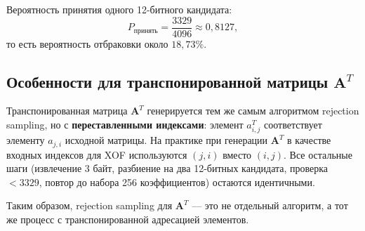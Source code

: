 \documentclass[11pt,a4paper]{article}
\begin{document}
Вероятность принятия одного 12-битного кандидата:
\[
    P_{\text{принять}} = \frac{3329}{4096} \approx 0{,}8127,
\]
то есть вероятность отбраковки около \(18{,}73\%\).

\subsection{Особенности для транспонированной матрицы \(\mathbf{A}^T\)}

Транспонированная матрица \(\mathbf{A}^T\) генерируется тем же самым алгоритмом rejection sampling, но с \textbf{переставленными индексами}: элемент \(a^T_{i,j}\) соответствует элементу \(a_{j,i}\) исходной матрицы. На практике при генерации \(\mathbf{A}^T\) в качестве входных индексов для XOF используются \((j,i)\) вместо \((i,j)\). Все остальные шаги (извлечение 3 байт, разбиение на два 12-битных кандидата, проверка \(< 3329\), повтор до набора 256 коэффициентов) остаются идентичными.

Таким образом, rejection sampling для \(\mathbf{A}^T\) — это не отдельный алгоритм, а тот же процесс с транспонированной адресацией элементов.


\end{document}

